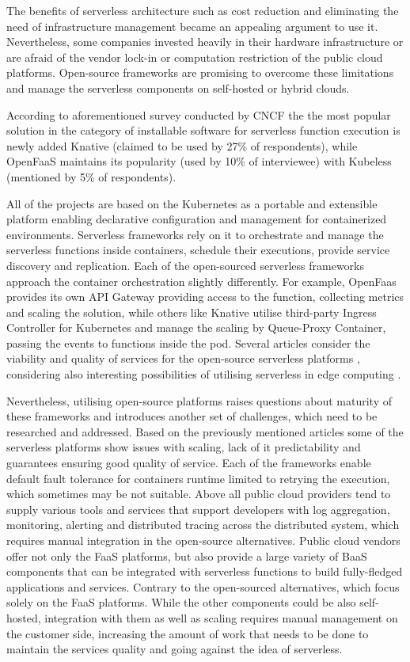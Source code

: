 The benefits of serverless architecture such as cost reduction and eliminating the need of infrastructure management became an appealing argument to use it. Nevertheless, some companies invested heavily in their hardware infrastructure or are afraid of the vendor lock-in or computation restriction of the public cloud platforms. Open-source frameworks are promising to overcome these limitations and manage the serverless components on self-hosted or hybrid clouds.

According to aforementioned survey conducted by CNCF \cite{CNCFServerlessSurvey2020} the the most popular solution in the category of installable software for serverless function execution is newly added Knative (claimed to be used by 27\% of respondents), while OpenFaaS maintains its popularity (used by 10\% of interviewee) with Kubeless (mentioned by 5\% of respondents).

All of the projects are based on the Kubernetes as a portable and extensible platform enabling declarative configuration and management for containerized environments. Serverless frameworks rely on it to orchestrate and manage the serverless functions inside containers, schedule their executions, provide service discovery and replication. Each of the open-sourced serverless frameworks approach the container orchestration slightly differently. For example, OpenFaas provides its own API Gateway providing access to the function, collecting metrics and scaling the solution, while others like Knative utilise third-party Ingress Controller for Kubernetes and manage the scaling by Queue-Proxy Container, passing the events to functions inside the pod. Several articles consider the viability and quality of services for the open-source serverless platforms \cite{OpenSourceServelessPerformance}, considering also interesting possibilities of utilising serverless in edge computing \cite{OpenSourceServelessEdge}.

Nevertheless, utilising open-source platforms raises questions about maturity of these frameworks and introduces another set of challenges, which need to be researched and addressed. Based on the previously mentioned articles some of the serverless platforms show issues with scaling, lack of it predictability and guarantees ensuring good quality of service. Each of the frameworks enable default fault tolerance for containers runtime limited to retrying the execution, which sometimes may be not suitable. Above all public cloud providers tend to supply various tools and services that support developers with log aggregation, monitoring, alerting and distributed tracing across the distributed system, which requires manual integration in the open-source alternatives. Public cloud vendors offer not only the FaaS platforms, but also provide a large variety of BaaS components that can be integrated with serverless functions to build fully-fledged applications and services. Contrary to the open-sourced alternatives, which focus solely on the FaaS platforms. While the other components could be also self-hosted, integration with them as well as scaling requires manual management on the customer side, increasing the amount of work that needs to be done to maintain the services quality and going against the idea of serverless.

